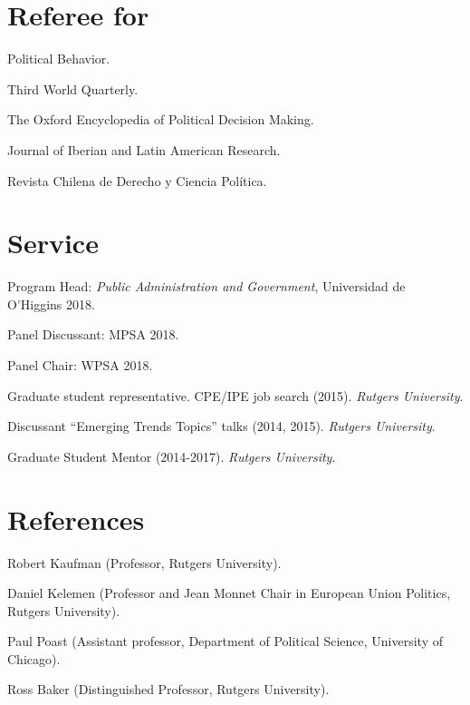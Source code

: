 \documentclass[letterpaper]{article}
\renewenvironment{itemize}{
  \begin{list}{}{
    \setlength{\leftmargin}{1.5em}
  }
}{
  \end{list}
}
\begin{document}

\section*{Referee for}
  \begin{itemize}
    \item[$\bullet$] Political Behavior.
    \item[$\bullet$] Third World Quarterly.
    \item[$\bullet$] The Oxford Encyclopedia of Political Decision Making.
    \item[$\bullet$] Journal of Iberian and Latin American Research.
    \item[$\bullet$] Revista Chilena de Derecho y Ciencia Pol\'itica.

  \end{itemize}




\section*{Service}

\begin{itemize}
\item[$\bullet$] Program Head: \emph{Public Administration and Government}, Universidad de O\'\unskip Higgins 2018.
\item[$\bullet$] Panel Discussant: MPSA 2018.
\item[$\bullet$] Panel Chair: WPSA 2018.
\item[$\bullet$] Graduate student representative. CPE/IPE job search (2015). \emph{Rutgers University}.
\item[$\bullet$] Discussant ``Emerging Trends Topics'' talks (2014, 2015). \emph{Rutgers University}.
\item[$\bullet$] Graduate Student Mentor (2014-2017). \emph{Rutgers University}.
\end{itemize}




\section*{References}
\begin{itemize}
\item[$\bullet$] Robert Kaufman {\scriptsize(Professor, Rutgers University).}
\item[$\bullet$] Daniel Kelemen {\scriptsize(Professor and Jean Monnet Chair in
European Union Politics, Rutgers University).}
\item[$\bullet$] Paul Poast {\scriptsize(Assistant professor, Department of Political Science, University of Chicago).}
\item[$\bullet$] Ross Baker {\scriptsize(Distinguished Professor, Rutgers University).}
\end{itemize}
\end{document}
